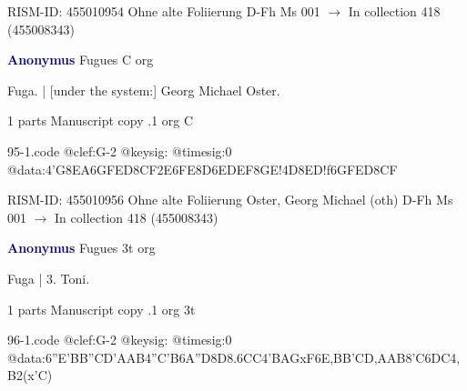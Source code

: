 \documentclass[twocolumn]{book}
\begin{document}
\newline RISM-ID: 455010954
\newline Ohne alte Foliierung
\newline D-Fh  Ms 001
\newline $\rightarrow$ In collection 418 (455008343)

\newline \par \vspace{7pt} \textcolor{darkblue}{\textbf{Anonymus  }}
\newline Fugues  C  
\newline org
\newline \begin{itshape}[f.79v, at left:] Fuga. | [under the system:] Georg Michael Oster.\end{itshape} 
\newline \textcolor{darkblue}{}  1 parts  
\newline Manuscript copy
.1  org  C  
\begin{filecontents*}{95-1.code}
@clef:G-2
@keysig:
@timesig:0
@data:4'G{8EA}{6GFED}{8CF}2E{6FE8D}{6EDEF}{8GE}!4D{8ED}!f{6GFED}{8CF}
\end{filecontents*}
\newline
%

\newline RISM-ID: 455010956
\newline Ohne alte Foliierung
\newline Oster, Georg Michael  (oth)
\newline D-Fh  Ms 001
\newline $\rightarrow$ In collection 418 (455008343)

\newline \par \vspace{7pt} \textcolor{darkblue}{\textbf{Anonymus  }}
\newline Fugues  3t  
\newline org
\newline \begin{itshape}[f.81v, at left:] Fuga | 3. Toni.\end{itshape} 
\newline \textcolor{darkblue}{}  1 parts  
\newline Manuscript copy
.1  org  3t  
\begin{filecontents*}{96-1.code}
@clef:G-2
@keysig:
@timesig:0
@data:{6''E'BB''C}{D'AAB}4''C'B{6A''D}8D{8.6CC}4'BAGxF{6E,BB'C}{D,AAB}8'C{6DC}4,B2(x'C)
\end{filecontents*}
\newline
%
\end{document}
